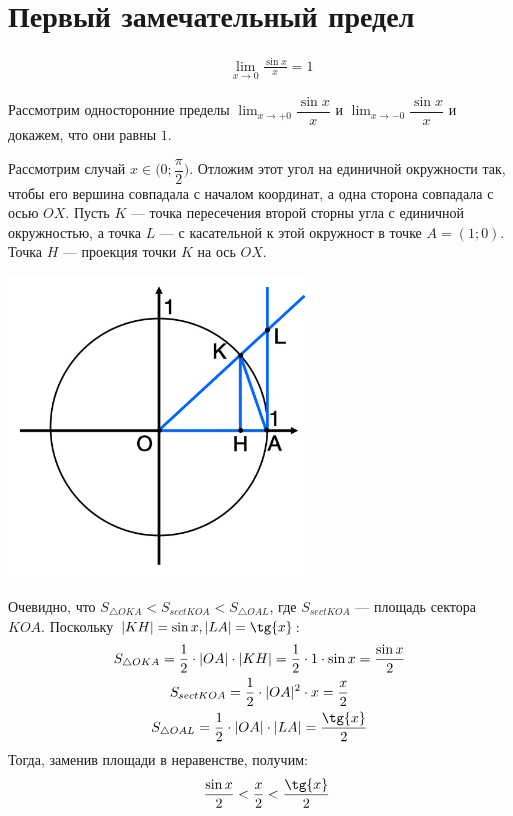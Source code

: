 \documentclass[12pt, fleqn]{extarticle}
\begin{document}
\newpage

\section{Первый замечательный предел}\label{sec:limit_1}
\begin{align*}
     &  &
    \lim_{x \to 0}{\frac{\sin{x}}{x}} = 1
\end{align*}

Рассмотрим односторонние пределы \(\displaystyle{\lim_{x \to +0}{\dfrac{\sin{x}}{x}}}\) и \(\displaystyle{\lim_{x \to -0}{\dfrac{\sin{x}}{x}}}\) и докажем, что они равны \(1\).

Рассмотрим случай \(x \in \Big(0; \dfrac{\pi}{2}\Big)\).
Отложим этот угол на единичной окружности так, чтобы его вершина совпадала с началом координат, а одна сторона совпадала с осью \(OX\).
Пусть \(K\) — точка пересечения второй сторны угла с единичной окружностью, а точка \(L\) — с касательной к этой окружност в точке \(A = (1; 0)\). Точка \(H\) — проекция точки \(K\) на ось \(OX\).

\begin{center}
    \includegraphics[width=0.6\textwidth]{limit_1.png}
\end{center}

Очевидно, что \(S_{\triangle OKA} < S_{sect KOA} < S_{\triangle OAL}\), где \(S_{sect KOA}\) — площадь сектора  \(KOA\). Поскольку \(|KH| = \sin{x}, |LA| = \tg{x}\):
\begin{gather*}
    S_{\triangle OKA} = \frac{1}{2} \cdot |OA| \cdot |KH| = \frac{1}{2} \cdot 1 \cdot \sin{x} = \frac{\sin{x}}{2} \\
    S_{sect KOA} = \frac{1}{2} \cdot |OA|^2 \cdot x = \frac{x}{2}                                                 \\
    S_{\triangle OAL} = \frac{1}{2} \cdot |OA| \cdot |LA| = \frac{\tg{x}}{2}
\end{gather*}
Тогда, заменив площади в неравенстве, получим:
\begin{align*}
     &  &
    \dfrac{\sin{x}}{2} < \dfrac{x}{2} < \dfrac{\tg{x}}{2}
\end{align*}
\end{document}
